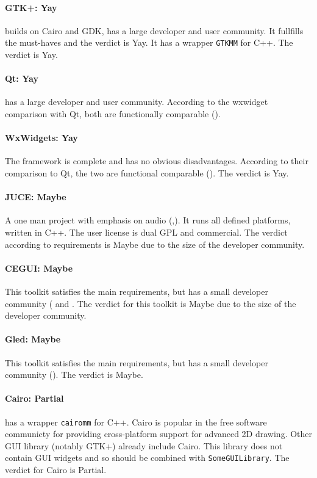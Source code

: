 \paragraph{GTK+: Yay} builds on Cairo and GDK, has a large developer and user
community.  It fullfills the must-haves and the verdict is Yay. It has a
wrapper \verb!GTKMM! for C++. The verdict is Yay.

\paragraph{Qt: Yay} has a large developer and user community. According to the
wxwidget comparison with Qt, both are functionally comparable
(\cite{wxwidget:comparison}).

\paragraph{WxWidgets: Yay} The framework is complete and has no obvious
disadvantages. According to their comparison to Qt, the two are functional
comparable (\cite{wxwidget:comparison}).  The verdict is Yay.

\paragraph{JUCE: Maybe} A one man project with emphasis on audio
(\cite{juce:juce},\cite{wiki:juce}).  It runs all defined platforms, written in
C++. The user license is dual GPL and commercial.  The verdict according to
requirements is Maybe due to the size of the developer community.

\paragraph{CEGUI: Maybe} This toolkit satisfies the main requirements, but has a
small developer community (\cite{wiki:cegui} and \cite{cegui:cegui}. The
verdict for this toolkit is Maybe due to the size of the developer community.

\paragraph{Gled: Maybe} This toolkit satisfies the main requirements, but has a
small developer community (\cite{gled:gled}). The verdict is Maybe.

\paragraph{Cairo: Partial} has a wrapper \verb!cairomm! for C++.  Cairo is
popular
in the free software communicty for providing cross-platform support for
advanced 2D drawing. Other GUI library (notably GTK+) already include Cairo.
This library does not contain GUI widgets and so should be combined with
\verb!SomeGUILibrary!. The verdict for Cairo is Partial.

